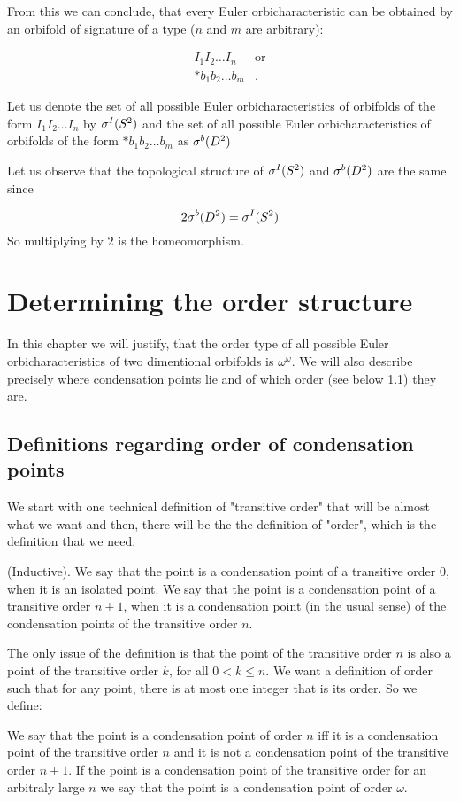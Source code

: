 From this we can conclude, that every Euler orbicharacteristic can be obtained 
by an orbifold of signature of a type ($n$ and $m$ are arbitrary):

\begin{align*}
I_1I_2\dots I_n & \textrm{or} \\
*b_1b_2\dots b_m &.
\end{align*}

Let us denote the set of all possible Euler orbicharacteristics of orbifolds of the form 
$I_1I_2\dots I_n$ by ${\mathcal{\sigma}^I(S^2)}$ and the set 
of all possible Euler orbicharacteristics of orbifolds of the form $*b_1b_2\dots b_m$ 
as ${\mathcal{\sigma}^b(D^2)}$

Let us observe that the topological structure of ${\mathcal{\sigma}^I(S^2)}$ and ${\mathcal{\sigma}^b(D^2)}$ are the same since 

\begin{equation*}
2{\mathcal{\sigma}^b(D^2)}={\mathcal{\sigma}^I(S^2)}
\end{equation*}
So multiplying by $2$ is the homeomorphism. 
\section{Determining the order structure}
In this chapter we will justify, that the order type of all possible Euler orbicharacteristics 
of two dimentional orbifolds is $\omega^\omega$. 
We will also describe precisely where condensation points lie and of which order 
(see below \ref{condensation_points_definitions}) they are.
\subsection{Definitions regarding order of condensation points}
\label{condensation_points_definitions} 
We start with one technical definition of "transitive order" that will be almost what we want
and then, there will be the the definition of "order", which is the definition that we need. \\ 
\begin{definition}
(Inductive). 
We say that the point is a condensation point of a transitive order $0$, when it is 
an isolated point. 
We say that the point is a condensation point of a transitive order $n + 1$, when it is 
a condensation point (in the usual sense) of the condensation points of the transitive order $n$. 
\end{definition}  
The only issue of the definition is that the point of the transitive order $n$ is also a point 
of the transitive order $k$, for all $0< k \leq n$. We want a definition of order such that 
for any point, there is at most one integer that is its order. So we define:
\begin{definition}
We say that the point is a condensation point of order $n$ iff it is a condensation point 
of the transitive order $n$ and it is not a condensation point of the transitive order $n+1$. 
If the point is a condensation point of the transitive order for an arbitraly large $n$ we say that 
the  point is a condensation point of order $\omega$.
\end{definition}

